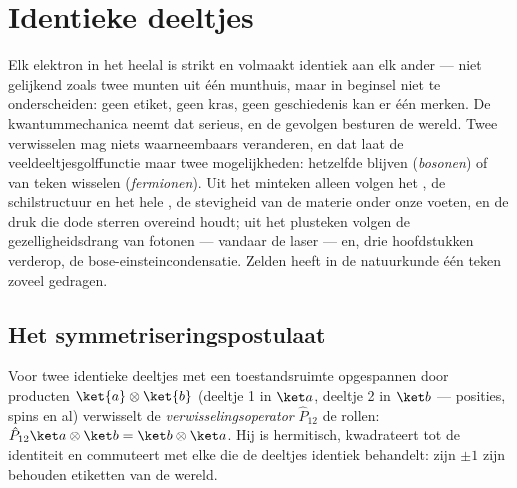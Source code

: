 \chapter{Identieke deeltjes}\label{ch:b3:identical-particles}

Elk elektron in het heelal is strikt en volmaakt identiek aan elk ander
--- niet gelijkend zoals twee munten uit één munthuis, maar in beginsel
niet te onderscheiden: geen etiket, geen kras, geen geschiedenis kan er
één merken. De kwantummechanica neemt dat serieus, en de gevolgen
besturen de wereld. Twee  verwisselen mag niets
waarneembaars veranderen, en dat laat de veeldeeltjesgolffunctie maar twee
mogelijkheden: hetzelfde blijven (\emph{bosonen}) of van teken wisselen
(\emph{fermionen}). Uit het minteken alleen volgen het
, de schilstructuur en het hele , de stevigheid van de materie onder onze voeten, en de druk die
dode sterren overeind houdt; uit het plusteken volgen de
gezelligheidsdrang van fotonen --- vandaar de laser --- en, drie
hoofdstukken verderop, de bose-einsteincondensatie. Zelden heeft in de
natuurkunde één teken zoveel gedragen.

\section{Het symmetriseringspostulaat}

\begin{definition}[Verwisseling]\label{def:b3:identical-particles:exchange}
Voor twee identieke deeltjes met een toestandsruimte opgespannen door
producten $\ket{a}\otimes\ket{b}$ (deeltje 1 in $\ket a$, deeltje 2 in
$\ket b$ --- posities, spins en al) verwisselt de
\emph{verwisselingsoperator} $\hat P_{12}$ de rollen: $\hat P_{12}\ket a\otimes\ket b =
\ket b\otimes\ket a$. Hij is hermitisch, kwadrateert tot
de identiteit en commuteert met elke  die de deeltjes
identiek behandelt: zijn  $\pm1$ zijn behouden etiketten van
de wereld.
\end{definition}

